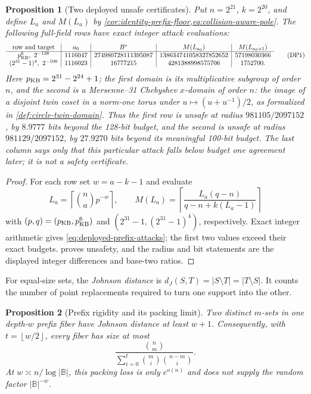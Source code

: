 \documentclass[11pt,a4paper]{amsart}
\numberwithin{equation}{section}
\newtheorem{proposition}[proposition]{Proposition}
\theoremstyle{remark}
\newcommand{\B}{\mathbb B}
\newcommand{\abs}[1]{\lvert #1\rvert}
\newcommand{\floor}[1]{\left\lfloor #1\right\rfloor}
\newcommand{\ceil}[1]{\left\lceil #1\right\rceil}
\begin{document}
\begin{proposition}[Two deployed unsafe certificates]
\label{prop:deployed-prefix-attacks}
Put \(n=2^{21}\), \(k=2^{20}\), and define \(L_a\) and \(M(L_a)\) by
\cref{cor:identity-prefix-floor,eq:collision-aware-pole}.  The following
full-field rows have exact integer attack evaluations:
\[
\begin{array}{c|c|c|c|c}
\text{row and target}&a_0&B^*&M(L_{a_0})&M(L_{a_0+1})\\ \hline
p_{\rm KB}^6,\ 2^{-128}&1116047&
274980728111395087&138634741058327852652&57198030366\\
(2^{31}-1)^4,\ 2^{-100}&1116023&
16777215&4281388998575706&1752700 .
\end{array}                                       \tag{DP1}
 \label{eq:deployed-prefix-attacks}
\]
Here \(p_{\rm KB}=2^{31}-2^{24}+1\); the first domain is its
multiplicative subgroup of order \(n\), and the second is a
Mersenne--31 Chebyshev \(x\)-domain of order \(n\): the image of a disjoint
twin coset in a norm-one torus under \(u\mapsto(u+u^{-1})/2\), as formalized
in \cref{def:circle-twin-domain}.
Thus the first row is unsafe at radius \(981105/2097152\), by
\(8.9777\) bits beyond the 128-bit budget, and the second is unsafe at
radius \(981129/2097152\), by \(27.9270\) bits beyond its meaningful
100-bit budget.  The last column says only that this particular attack
falls below budget one agreement later; it is not a safety certificate.
\end{proposition}

\begin{proof}
For each row set \(w=a-k-1\) and evaluate
\[
 L_a=\ceil{\binom na p^{-w}},\qquad
 M(L_a)=\ceil{\frac{L_a(q-n)}{q-n+k(L_a-1)}}
\]
with \((p,q)=(p_{\rm KB},p_{\rm KB}^6)\) and
\((2^{31}-1,(2^{31}-1)^4)\), respectively.  Exact integer arithmetic
gives \eqref{eq:deployed-prefix-attacks}; the first two values exceed
their exact budgets.   proves unsafety,
and the radius and bit statements are the displayed integer differences
and base-two ratios.
\end{proof}

For equal-size sets, the \emph{Johnson distance} is
\(d_J(S,T)=\abs{S\setminus T}=\abs{T\setminus S}\).  It counts the
number of point replacements required to turn one support into the other.

\begin{proposition}[Prefix rigidity and its packing limit]
\label{prop:prefix-rigidity-full}
Two distinct \(m\)-sets in one depth-\(w\) prefix fiber have Johnson
distance at least \(w+1\).  Consequently, with
\(t=\floor{w/2}\), every fiber has size at most
\[
 \frac{\binom nm}{\sum_{i=0}^t\binom mi\binom{n-m}{i}}.
 \tag{4.4}\label{eq:packing-fiber-cap}
\]
At \(w\asymp n/\log\abs\B\), this packing loss is only
\(e^{o(n)}\) and does not supply the random factor \(\abs\B^{-w}\).
\end{proposition}
\end{document}
